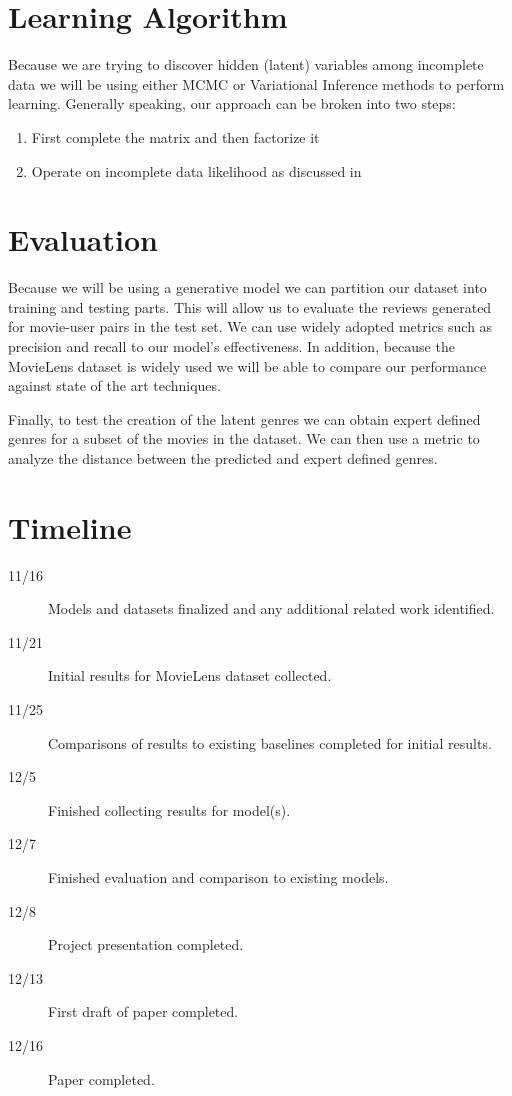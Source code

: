\documentclass{article} %
\begin{document}
\cite{kermarrec:hal-00673330}

\section{Learning Algorithm}
\label{alg}
Because we are trying to discover hidden (latent) variables among incomplete data we will be using either MCMC or Variational Inference methods to perform learning. Generally speaking, our approach can be broken into two steps:
\begin{enumerate}
	\item First complete the matrix and then factorize it
	\item Operate on incomplete data likelihood as discussed in \cite{Dempster77maximumlikelihood}
\end{enumerate}

\section{Evaluation}
\label{eval}
Because we will be using a generative model we can partition our dataset into
training and testing parts. This will allow us to evaluate the reviews generated
for movie-user pairs in the test set. We can use widely adopted metrics such
as precision and recall to our model's effectiveness. In addition, because
the MovieLens dataset is widely used we will be able to compare our performance
against state of the art techniques.

Finally, to test the creation of the latent genres we can obtain expert defined
genres for a subset of the movies in the dataset. We can then use a metric to
analyze the distance between the predicted and expert defined genres.

\section{Timeline}
\label{time}

\begin{description}
	\item[11/16] Models and datasets finalized and any additional
			related work identified.
	\item[11/21] Initial results for MovieLens dataset collected.
	\item[11/25] Comparisons of results to existing baselines completed
			for initial results.
	\item[12/5] Finished collecting results for model(s).
	\item[12/7] Finished evaluation and comparison to existing models.
	\item[12/8] Project presentation completed.
	\item[12/13] First draft of paper completed.
	\item[12/16] Paper completed.
\end{description}


\end{document}
